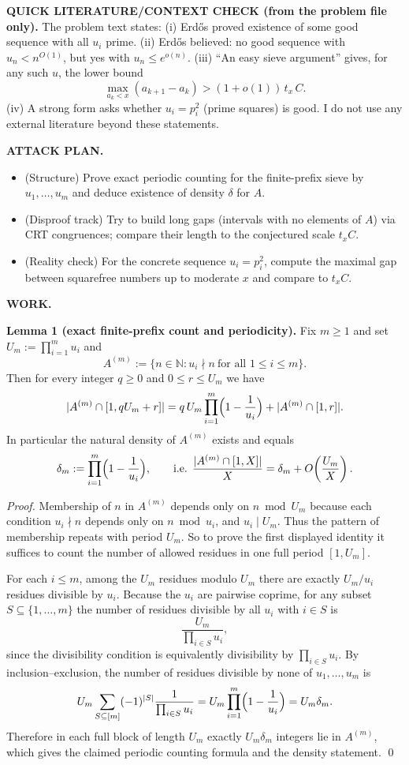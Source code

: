 \medskip
\noindent\textbf{QUICK LITERATURE/CONTEXT CHECK (from the problem file only).}
The problem text states:
(i) Erd\H{o}s proved existence of some good sequence with all $u_i$ prime.
(ii) Erd\H{o}s believed: no good sequence with $u_n<n^{O(1)}$, but yes with $u_n\le e^{o(n)}$.
(iii) ``An easy sieve argument'' gives, for any such $u$, the lower bound
\[
\max_{a_k<x}(a_{k+1}-a_k)>(1+o(1))\,t_x\,C.
\]
(iv) A strong form asks whether $u_i=p_i^2$ (prime squares) is good.
I do not use any external literature beyond these statements.

\medskip
\noindent\textbf{ATTACK PLAN.}
\begin{itemize}
\item (Structure) Prove exact periodic counting for the finite-prefix sieve by $u_1,\dots,u_m$ and deduce existence of density $\delta$ for $A$.
\item (Disproof track) Try to build long gaps (intervals with no elements of $A$) via CRT congruences; compare their length to the conjectured scale $t_xC$.
\item (Reality check) For the concrete sequence $u_i=p_i^2$, compute the maximal gap between squarefree numbers up to moderate $x$ and compare to $t_xC$.
\end{itemize}

\medskip
\noindent\textbf{WORK.}

\medskip
\noindent\textbf{Lemma 1 (exact finite-prefix count and periodicity).}
Fix $m\ge 1$ and set $U_m:=\prod_{i=1}^m u_i$ and
\[A^{(m)}:=\{n\in\mathbb N: u_i\nmid n\ \text{for all }1\le i\le m\}.
\]
Then for every integer $q\ge 0$ and $0\le r\le U_m$ we have
\[
|A^{(m)}\cap[1,qU_m+r]| = q\,U_m\prod_{i=1}^m\Bigl(1-\frac{1}{u_i}\Bigr) + |A^{(m)}\cap[1,r]|.
\]
In particular the natural density of $A^{(m)}$ exists and equals
\[\delta_m:=\prod_{i=1}^m\Bigl(1-\frac{1}{u_i}\Bigr),\qquad\text{i.e. }\frac{|A^{(m)}\cap[1,X]|}{X}=\delta_m+O\!\left(\frac{U_m}{X}\right).
\]

\noindent\emph{Proof.}
Membership of $n$ in $A^{(m)}$ depends only on $n\bmod U_m$ because each condition $u_i\nmid n$ depends only on $n\bmod u_i$, and $u_i\mid U_m$.
Thus the pattern of membership repeats with period $U_m$.
So to prove the first displayed identity it suffices to count the number of allowed residues in one full period $[1,U_m]$.

For each $i\le m$, among the $U_m$ residues modulo $U_m$ there are exactly $U_m/u_i$ residues divisible by $u_i$.
Because the $u_i$ are pairwise coprime, for any subset $S\subseteq\{1,\dots,m\}$ the number of residues divisible by all $u_i$ with $i\in S$ is
\[\frac{U_m}{\prod_{i\in S}u_i},
\]
since the divisibility condition is equivalently divisibility by $\prod_{i\in S}u_i$.
By inclusion--exclusion, the number of residues divisible by none of $u_1,\dots,u_m$ is
\[
U_m\sum_{S\subseteq[m]}(-1)^{|S|}\frac{1}{\prod_{i\in S}u_i}=U_m\prod_{i=1}^m\Bigl(1-\frac{1}{u_i}\Bigr)=U_m\delta_m.
\]
Therefore in each full block of length $U_m$ exactly $U_m\delta_m$ integers lie in $A^{(m)}$, which gives the claimed periodic counting formula and the density statement. \qed

